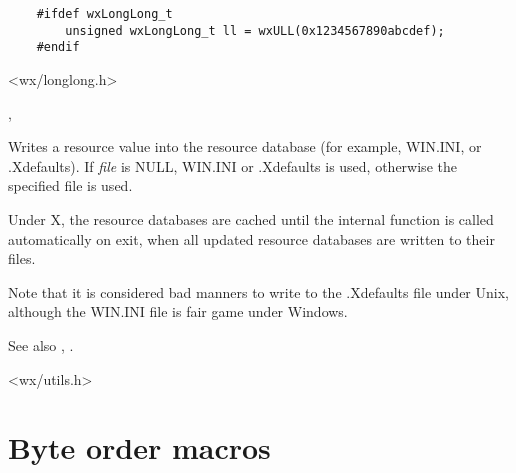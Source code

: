 \begin{verbatim}
    #ifdef wxLongLong_t
        unsigned wxLongLong_t ll = wxULL(0x1234567890abcdef);
    #endif
\end{verbatim}


<wx/longlong.h>


, 


\label{wxwriteresource}





Writes a resource value into the resource database (for example, WIN.INI, or
.Xdefaults). If {\it file} is NULL, WIN.INI or .Xdefaults is used,
otherwise the specified file is used.

Under X, the resource databases are cached until the internal function
 is called automatically on exit, when
all updated resource databases are written to their files.

Note that it is considered bad manners to write to the .Xdefaults
file under Unix, although the WIN.INI file is fair game under Windows.

See also , .


<wx/utils.h>



\section{Byte order macros}\label{byteordermacros}

